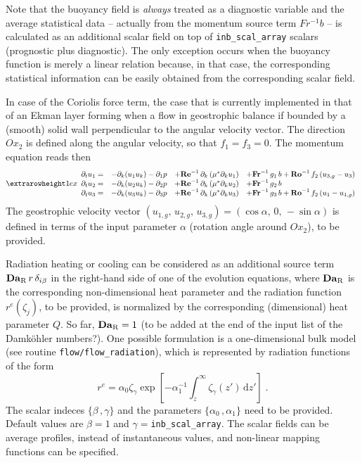 Note that the buoyancy field is {\it always} treated as a diagnostic variable and the average statistical data -- actually from the momentum source term $Fr^{-1}b$ -- is calculated as an additional scalar field on top of {\tt   inb\_scal\_array} scalars (prognostic plus diagnostic). The only exception occurs when the buoyancy function is merely a linear relation because, in that case, the corresponding statistical information can be easily obtained from the corresponding scalar field.

In case of the Coriolis force term, the case that is currently implemented in that of an Ekman layer forming when a flow in geostrophic balance if bounded by a (smooth) solid wall perpendicular to the angular velocity vector. The direction $Ox_2$ is defined along the angular velocity, so that $f_1=f_3=0$. The momentum equation reads then
\begin{equation}
\setlength{\extrarowheight}{1ex}
\begin{array}{rlll}
  \partial_t  u_1 =& 
  -\partial_k ( u_1 u_k ) -\partial_1 p &
  +\mathrm{\bf Re}^{-1}\,\partial_k  \left( \mu^{*} \partial_k u_1\right) &
  +\mathrm{\bf Fr}^{-1}\, g_1\,b+\mathrm{\bf Ro}^{-1}\,f_2\,(u_{3,g}-u_3) \\
  \partial_t  u_2 =& 
  -\partial_k ( u_2 u_k ) -\partial_2 p &
  +\mathrm{\bf Re}^{-1}\,\partial_k  \left( \mu^{*} \partial_k u_2\right) &
  +\mathrm{\bf Fr}^{-1}\, g_2\,b \\
  \partial_t  u_3 =& 
  -\partial_k ( u_3 u_k ) -\partial_3 p &
  +\mathrm{\bf Re}^{-1}\,\partial_k  \left( \mu^{*} \partial_k u_3\right) &
  +\mathrm{\bf Fr}^{-1}\, g_3\,b+\mathrm{\bf Ro}^{-1}\,f_2\,(u_1-u_{1,g}) 
\end{array}
\end{equation}
The geostrophic velocity vector $(u_{1,g},\,u_{2,g},\,u_{3,g}) = (\cos\alpha,\,0,\,-\sin\alpha)$ is defined in terms of the input parameter $\alpha$ (rotation angle around $Ox_2$), to be provided.

Radiation heating or cooling can be considered as an additional source term $\mathrm{\bf Da}_\mathrm{R}\,r\,\delta_{i\beta}$ in the right-hand side of one of the evolution equations, where $\mathrm{\bf Da}_\mathrm{R}$ is the corresponding non-dimensional heat parameter and the radiation function $r^e(\zeta_j)$, to be provided, is normalized by the corresponding (dimensional) heat parameter $Q$. So far, $\mathrm{\bf Da}_\mathrm{R}=1$ (to be added at the end of the input list of the Damk{\"o}hler numbers?). One possible formulation is a one-dimensional bulk model (see routine {\tt flow/flow\_radiation}), which is represented by radiation functions of the form
\begin{equation}
r^e=\alpha_0 \zeta_{\gamma}\exp\left[
-\alpha_1^{-1}\int_z^\infty\zeta_{\gamma}(z')\,\mathrm{d}z'\right] \;.
\end{equation}
The scalar indeces $\{\beta\,,\gamma\}$ and the parameters $\{\alpha_0\,,\alpha_1\}$ need to be provided. Default values are $\beta=1$ and $\gamma=${\tt inb\_scal\_array}. The scalar fields can be average profiles, instead of instantaneous values, and non-linear mapping functions can be specified.

